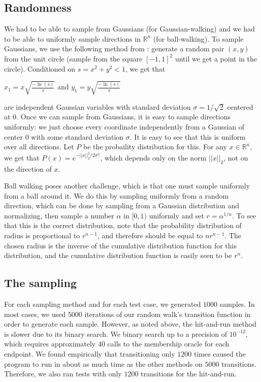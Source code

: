 \documentclass[11pt]{article}
\begin{document}
\subsection{Randomness}

We had to be able to sample from Gaussians (for Gaussian-walking) and we had to be able to uniformly sample directions in $\mathbb{R}^n$ (for ball-walking). To sample Gaussians, we use the following method from \cite{Marsaglia}: generate a random pair $(x,y)$ from the unit circle (sample from the square $[-1,1]^2$ until we get a point in the circle). Conditioned on $s = x^2 + y^2 < 1$, we get that
\begin{center}
$\displaystyle x_1 = x\sqrt{\frac{-\ln(s)}{s}}$ and $\displaystyle y_1 = y\sqrt{\frac{-\ln(s)}{s}}$
\end{center}
are independent Gaussian variables with standard deviation $\sigma = 1/\sqrt{2}$ centered at $0$. Once we can sample from Gaussians, it is easy to sample directions uniformly: we just choose every coordinate independently from a Gaussian of center $0$ with some standard deviation $\sigma$. It is easy to see that this is uniform over all directions. Let $P$ be the probaility distribution for this. For any $x\in\mathbb{R}^n$, we get that $P(x) = e^{-||x||_2^2 / 2\sigma^2}$, which depends only on the norm $||x||_2$, not on the direction of $x$.

Ball walking poses another challenge, which is that one must sample uniformly from a ball around it. We do this by sampling uniformly from a random direction, which can be done by sampling from a Gaussian distribution and normalizing, then sample a number $\alpha$ in $[0,1)$ uniformly and set $r = \alpha^{1/n}$. To see that this is the correct distribution, note that the probability distribution of radius is proportional to $r^{n-1}$, and therefore should be equal to $nr^{n-1}$. The chosen radius is the inverse of the cumulative distribution function for this distribution, and the cumulative distribution function is easily seen to be $r^n$.

\subsection{The sampling}

For each sampling method and for each test case, we generated $1000$ samples. In most cases, we used $5000$ iterations of our random walk's transition function in order to generate each sample. However, as noted above, the hit-and-run method is slower due to its binary search. We binary search up to a precision of $10^{-12}$, which requires approximately $40$ calls to the membership oracle for each endpoint. We found empirically that transitioning only $1200$ times caused the program to run in about as much time as the other methods on $5000$ transitions. Therefore, we also ran tests with only $1200$ transitions for the hit-and-run.
\end{document}
